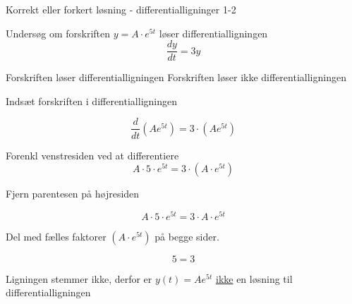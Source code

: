 \documentclass{article}
\begin{document}
\begin{exercise}{Korrekt eller forkert løsning - differentialligninger 1-2}
	
	
	Undersøg om forskriften $y = A \cdot e^{5t}$ løser differentialligningen
	\[
	\frac{dy}{dt} = 3y
	\]

\begin{multichoice}
	\itemfalse Forskriften løser differentialligningen 
	\itemtrue Forskriften løser ikke differentialligningen 
\end{multichoice}
	
	\hint
	
	Indsæt forskriften i differentialligningen
	
	\hint
	\[
	\frac{d}{dt} \left( A e^{5t}\right) = 3 \cdot \left( A e^{5t} \right)
	\]
	
	
	\hint
	
	Forenkl venstresiden ved at differentiere
	\[
	A \cdot 5 \cdot e^{5t} = 3 \cdot \left(A \cdot e^{5t} \right)
	\]
	
	\hint
	
	Fjern parentesen på højresiden
	
	\hint
	\[
	A \cdot5 \cdot e^{5t} = 3 \cdot A \cdot e^{5t}
	\]
	
	\hint
	Del med fælles faktorer $\left( A \cdot e^{5t} \right)$ på begge sider.
	
	\hint
	
	\[
	5 = 3
	\]
	
	
	\hint
	
	Ligningen stemmer ikke, derfor er $y(t) = A e^{5t}$ \underline{ikke} en løsning til differentialligningen
	
\end{exercise}

\newpage
\end{document}
